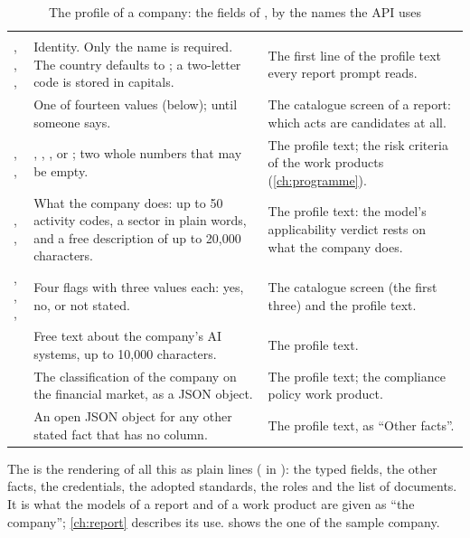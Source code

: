\begin{xltabular}{\textwidth}{@{}L{37mm}YL{44mm}@{}}
\caption{The profile of a company: the fields of , by the names the API uses}\label{tab:company:profile}\\
\toprule
{} &  &  \\
\midrule
\endfirsthead
\toprule
{} &  &  \\
\midrule
\endhead
\bottomrule
\endlastfoot
{}, , ,  &
  Identity. Only the name is required. The country defaults to ; a two-letter code is
  stored in capitals. &
  The first line of the profile text every report prompt reads. \\
 &
  One of fourteen values (below);  until someone says. &
  The catalogue screen of a report: which acts are candidates at all. \\
, ,  &
  , , ,  or ; two whole
  numbers that may be empty. &
  The profile text; the risk criteria of the work products (\cref{ch:programme}). \\
, ,  &
  What the company does: up to 50 activity codes, a sector in plain words, and a free
  description of up to 20,000 characters. &
  The profile text: the model's applicability verdict rests on what the company does. \\
, , ,  &
  Four flags with three values each: yes, no, or not stated. &
  The catalogue screen (the first three) and the profile text. \\
 &
  Free text about the company's AI systems, up to 10,000 characters. &
  The profile text. \\
 &
  The classification of the company on the financial market, as a JSON object. &
  The profile text; the compliance policy work product. \\
 &
  An open JSON object for any other stated fact that has no column. &
  The profile text, as \enquote{Other facts}. \\
\end{xltabular}

The  is the rendering of all this as plain lines
( in ): the typed fields, the other facts, the
credentials, the adopted standards, the roles and the list of documents. It is what the
models of a report and of a work product are given as \enquote{the company}; \cref{ch:report}
describes its use.  shows the one of the sample company.

